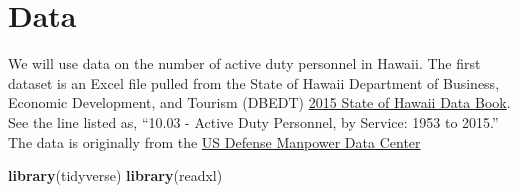 \documentclass[]{book}
\newenvironment{Shaded}{\begin{snugshade}}{\end{snugshade}}
\newcommand{\KeywordTok}[1]{\textcolor[rgb]{0.13,0.29,0.53}{\textbf{{#1}}}}
\newcommand{\DataTypeTok}[1]{\textcolor[rgb]{0.13,0.29,0.53}{{#1}}}
\newcommand{\DecValTok}[1]{\textcolor[rgb]{0.00,0.00,0.81}{{#1}}}
\newcommand{\StringTok}[1]{\textcolor[rgb]{0.31,0.60,0.02}{{#1}}}
\newcommand{\NormalTok}[1]{{#1}}
\theoremstyle{definition}
\theoremstyle{definition}
\theoremstyle{remark}
\begin{document}
\section{Data}\label{data-1}

We will use data on the number of active duty personnel in Hawaii. The
first dataset is an Excel file pulled from the State of Hawaii
Department of Business, Economic Development, and Tourism (DBEDT)
\href{http://dbedt.hawaii.gov/economic/databook/2015-individual/}{2015
State of Hawaii Data Book}. See the line listed as, ``10.03 - Active
Duty Personnel, by Service: 1953 to 2015.'' The data is originally from
the \href{www.dmdc.osd.mil/appj/dwp/stats_reports.jsp}{US Defense
Manpower Data Center}

\begin{Shaded}
\begin{Highlighting}[]
\KeywordTok{library}\NormalTok{(tidyverse)}
\KeywordTok{library}\NormalTok{(readxl)}
\end{Highlighting}
\end{Shaded}

\begin{Shaded}
\end{Shaded}
\end{document}
